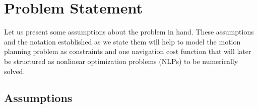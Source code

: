 \let\savecleardoublepage\cleardoublepage
\let\cleardoublepage\clearpage
\chapter{Problem Statement}
\let\cleardoublepage\savecleardoublepage

Let us present some assumptions about the problem in hand. These assumptions and the notation established as we state them will help to model the motion planning problem as constraints and one navigation cost function that will later be structured as nonlinear optimization problems (NLPs) to be numerically solved.

\section{Assumptions}


